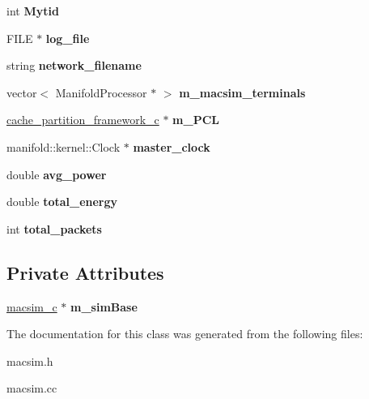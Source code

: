 \begin{DoxyCompactItemize}
\item 
\hypertarget{classmacsim__c_a5cb68870036c6d0b2a3f7f3e10f1b54d}{
int {\bfseries Mytid}}
\label{classmacsim__c_a5cb68870036c6d0b2a3f7f3e10f1b54d}

\item 
\hypertarget{classmacsim__c_a2868eea271765027b03ac37d75750721}{
FILE $\ast$ {\bfseries log\_\-file}}
\label{classmacsim__c_a2868eea271765027b03ac37d75750721}

\item 
\hypertarget{classmacsim__c_ac60101dda5b72c0e35ddcd6e8a791ddc}{
string {\bfseries network\_\-filename}}
\label{classmacsim__c_ac60101dda5b72c0e35ddcd6e8a791ddc}

\item 
\hypertarget{classmacsim__c_adf5e19f936f69235ab7cb034b6b084db}{
vector$<$ ManifoldProcessor $\ast$ $>$ {\bfseries m\_\-macsim\_\-terminals}}
\label{classmacsim__c_adf5e19f936f69235ab7cb034b6b084db}

\item 
\hypertarget{classmacsim__c_ae89f4011df241d6aebd32fe9a96f54f1}{
\hyperlink{classcache__partition__framework__c}{cache\_\-partition\_\-framework\_\-c} $\ast$ {\bfseries m\_\-PCL}}
\label{classmacsim__c_ae89f4011df241d6aebd32fe9a96f54f1}

\item 
\hypertarget{classmacsim__c_a8fd5541cc2e4c85af747d546df7dc7bd}{
manifold::kernel::Clock $\ast$ {\bfseries master\_\-clock}}
\label{classmacsim__c_a8fd5541cc2e4c85af747d546df7dc7bd}

\item 
\hypertarget{classmacsim__c_a7617bbe4e19a06e3182deb4e3d930621}{
double {\bfseries avg\_\-power}}
\label{classmacsim__c_a7617bbe4e19a06e3182deb4e3d930621}

\item 
\hypertarget{classmacsim__c_a37d6e196da37d9f4f80e5d7a3e7c0604}{
double {\bfseries total\_\-energy}}
\label{classmacsim__c_a37d6e196da37d9f4f80e5d7a3e7c0604}

\item 
\hypertarget{classmacsim__c_aa1da137da2034ad320493d8a495b2336}{
int {\bfseries total\_\-packets}}
\label{classmacsim__c_aa1da137da2034ad320493d8a495b2336}

\end{DoxyCompactItemize}
\subsection*{Private Attributes}
\begin{DoxyCompactItemize}
\item 
\hypertarget{classmacsim__c_a9a5c822e0f844e6f712630fef243abf0}{
\hyperlink{classmacsim__c}{macsim\_\-c} $\ast$ {\bfseries m\_\-simBase}}
\label{classmacsim__c_a9a5c822e0f844e6f712630fef243abf0}

\end{DoxyCompactItemize}


The documentation for this class was generated from the following files:\begin{DoxyCompactItemize}
\item 
macsim.h\item 
macsim.cc\end{DoxyCompactItemize}
